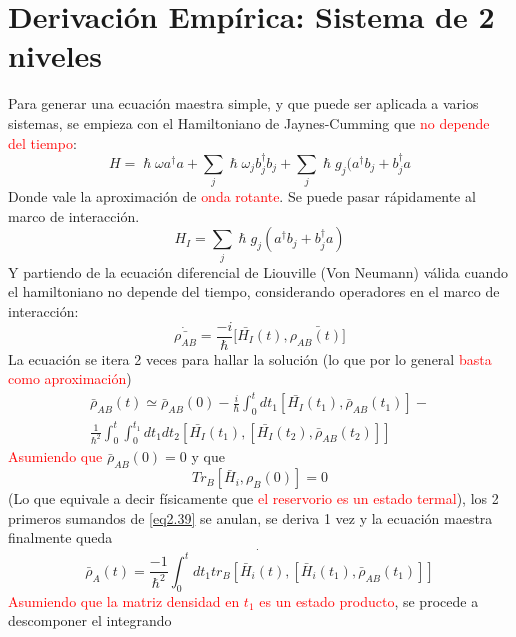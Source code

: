 \documentclass{book}
\begin{document}
\section{Derivación Empírica: Sistema de 2 niveles}
Para generar una ecuación maestra simple, y que puede ser aplicada a varios sistemas, se empieza con el Hamiltoniano de Jaynes-Cumming que \textcolor{red}{no depende del tiempo}: 
\begin{equation}\label{eq2.36}H=\hslash\omega a^\dag a+\sum_j \hslash \omega_jb_j^\dag b_j+\sum_j \hslash g_j(a^\dag b_j+b_j^\dag a\end{equation}
Donde vale la aproximación de \textcolor{red}{onda rotante}. Se puede pasar rápidamente al marco de interacción.
\begin{equation}\label{eq2.37}H_I=\sum_j \hslash g_j(a^\dag b_j+b_j^\dag a) \end{equation} Y partiendo de la ecuación diferencial de Liouville (Von Neumann) válida cuando el hamiltoniano no depende del tiempo, considerando operadores en el marco de interacción:
\begin{equation}\label{eq2.38}\dot{\bar{\rho_{AB}}}=\frac{-i}{\hslash}[\bar{H_I}(t),\bar{\rho_{AB}(t)]}\end{equation}
La ecuación se itera 2 veces para hallar la solución (lo que por lo general \textcolor{red}{basta como aproximación})
\begin{equation}\label{eq2.39} \begin{aligned}\bar{\rho}_{AB}(t)\simeq\bar\rho_{AB}(0)-\frac{i}{\hslash}\int_0^t dt_1[\bar{H_I}(t_1),\bar{\rho}_{AB}(t_1)]- \\ \frac{1}{\hslash^2}\int_0^t\int_0^{t_1}dt_1dt_2[\bar{H_I}(t_1),[\bar{H_I}(t_2),\bar{\rho}_{AB}(t_2)]]\end{aligned}\end{equation}
\textcolor{red}{Asumiendo que} $\bar{\rho}_{AB}(0)=0$ y que 
\begin{equation}\label{eq2.40}Tr_B[\bar{H}_i,\rho_B(0)]=0\end{equation}
(Lo que equivale a decir físicamente que \textcolor{red}{el reservorio es un estado termal}), los 2 primeros sumandos de \textcolor{blue}{\ref{eq2.39}} se anulan, se deriva 1 vez y la ecuación maestra finalmente queda
\begin{equation}\label{eq2.41}\dot{\bar{\rho}_A(t)=\frac{-1}{\hslash^2}\int_0^tdt_1 tr_B[\bar{H}_i(t),[\bar{H}_i(t_1),\bar{\rho}_{AB}(t_1)]]}\end{equation}
\textcolor{red}{Asumiendo que la matriz densidad en $t_1$ es un estado producto}, se procede a descomponer el integrando 
\end{document}
